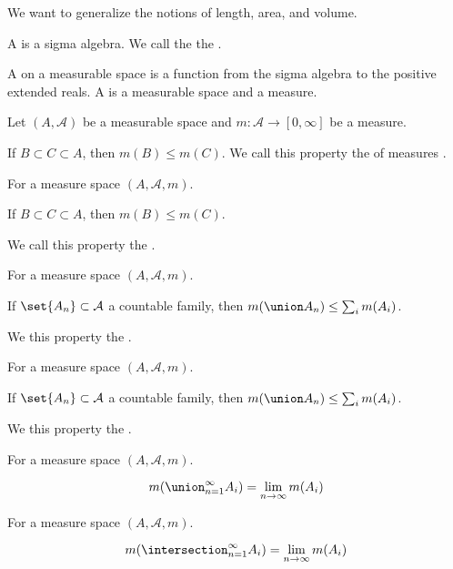 

We want to generalize the notions
of length, area, and volume.


A
is a sigma algebra.
We call the
the .

A
on a measurable space
is a function from the sigma algebra
to the positive extended reals.
A
is a measurable space and a measure.



\begin{prop}
  Let $(A, \mathcal{A})$ be a measurable space and
  $m: \mathcal{A} \to [0, \infty]$ be a measure.

  If $B \subset C \subset A$, then $m(B) \leq m(C)$.
  We call this property the of measures
  .
\end{prop}

\begin{prop}
  For a measure space $(A, \mathcal{A}, m)$.

  If $B \subset C \subset A$, then $m(B) \leq m(C)$.

  We call this property the
  .
\end{prop}

\begin{prop}
  For a measure space $(A, \mathcal{A}, m)$.

  If $\set{A_n} \subset \mathcal{A}$ a countable family,
  then $m(\union A_n) \leq \sum_{i} m(A_i)$.

  We this property the
  .
\end{prop}

\begin{prop}
  For a measure space $(A, \mathcal{A}, m)$.

  If $\set{A_n} \subset \mathcal{A}$ a countable family,
  then $m(\union A_n) \leq \sum_{i} m(A_i)$.

  We this property the
  .
\end{prop}

\begin{prop}
  For a measure space $(A, \mathcal{A}, m)$.

  $$
    m(\union_{n = 1}^{\infty} A_i) = \lim_{n \to \infty} m(A_i)
  $$
\end{prop}

\begin{prop}
  For a measure space $(A, \mathcal{A}, m)$.

  $$
    m(\intersection_{n = 1}^{\infty} A_i) = \lim_{n \to \infty} m(A_i)
  $$
\end{prop}


\begin{expl}
\end{expl}
